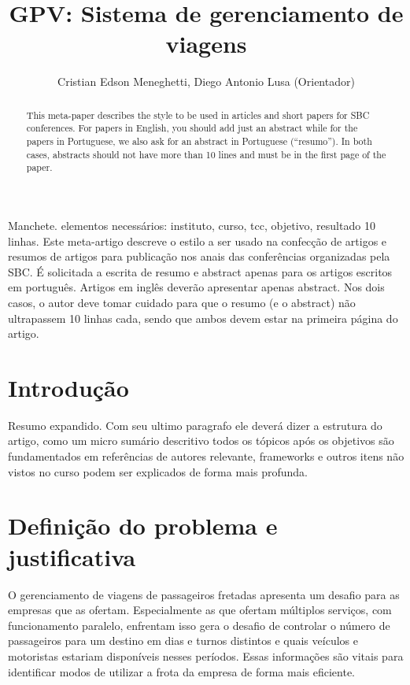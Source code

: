 \documentclass[12pt]{article}
\title{GPV: Sistema de gerenciamento de viagens}
\author{Cristian Edson Meneghetti, {\small Diego Antonio Lusa (Orientador)}}
\begin{document}
 

\maketitle

\begin{abstract}
  This meta-paper describes the style to be used in articles and short papers
  for SBC conferences. For papers in English, you should add just an abstract
  while for the papers in Portuguese, we also ask for an abstract in
  Portuguese (``resumo''). In both cases, abstracts should not have more than
  10 lines and must be in the first page of the paper.
\end{abstract}
     
\begin{resumo} 
Manchete. elementos necessários: instituto, curso, tcc, objetivo, resultado 10 linhas. Este meta-artigo descreve o estilo a ser usado na confecção de artigos e  resumos de artigos para publicação nos anais das conferências organizadas  pela SBC. É solicitada a escrita de resumo e abstract apenas para os artigos  escritos em português. Artigos em inglês deverão apresentar apenas abstract.  Nos dois casos, o autor deve tomar cuidado para que o resumo (e o abstract)  não ultrapassem 10 linhas cada, sendo que ambos devem estar na primeira página do artigo.
\end{resumo}


\section{Introdução}

Resumo expandido. Com seu ultimo paragrafo ele deverá dizer a estrutura do artigo, como um micro sumário descritivo todos os tópicos após os objetivos são fundamentados em referências de autores relevante, frameworks e outros itens não vistos no curso podem ser explicados de forma mais profunda.

\section{Definição do problema e justificativa} \label{sec:firstpage}

O gerenciamento de viagens de passageiros fretadas apresenta um desafio para as empresas que as ofertam. Especialmente as que ofertam múltiplos serviços, com funcionamento paralelo, enfrentam isso gera o desafio de controlar o número de passageiros para um destino em dias e turnos distintos e quais veículos e motoristas estariam disponíveis nesses períodos. Essas informações são vitais para identificar modos de utilizar a frota da empresa de forma mais eficiente.
\end{document}

